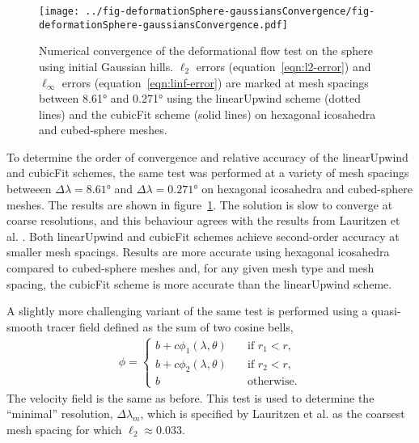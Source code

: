 \begin{figure}
	\centering
	\texttt{[image: ../fig-deformationSphere-gaussiansConvergence/fig-deformationSphere-gaussiansConvergence.pdf]}
%
	\caption{Numerical convergence of the deformational flow test on the sphere using initial Gaussian hills.  $\ell_2$ errors (equation~\ref{eqn:l2-error}) and $\ell_\infty$ errors (equation~\ref{eqn:linf-error}) are marked at mesh spacings between \ang{8.61} and \ang{0.271} using the linearUpwind scheme (dotted lines) and the cubicFit scheme (solid lines) on hexagonal icosahedra and cubed-sphere meshes.}
	\label{fig:deformationSphere-gaussian-convergence}
\end{figure}

To determine the order of convergence and relative accuracy of the linearUpwind and cubicFit schemes, the same test was performed at a variety of mesh spacings betweeen $\Delta \lambda = \ang{8.61}$ and $\Delta \lambda = \ang{0.271}$ on hexagonal icosahedra and cubed-sphere meshes.  The results are shown in figure~\ref{fig:deformationSphere-gaussian-convergence}.
The solution is slow to converge at coarse resolutions, and this behaviour agrees with the results from Lauritzen et al. \citep{lauritzen2012}.  Both linearUpwind and cubicFit schemes achieve second-order accuracy at smaller mesh spacings. 
Results are more accurate using hexagonal icosahedra compared to cubed-sphere meshes and, for any given mesh type and mesh spacing, the cubicFit scheme is more accurate than the linearUpwind scheme.

A slightly more challenging variant of the same test is performed using a quasi-smooth tracer field defined as the sum of two cosine bells,
\begin{align}
	\phi =
	\begin{cases}
		b + c \phi_1(\lambda, \theta) & \quad \text{if $r_1 < r$,} \\
		b + c \phi_2(\lambda, \theta) & \quad \text{if $r_2 < r$,} \\
		b			      & \quad \text{otherwise.}
	\end{cases}
\end{align}
The velocity field is the same as before.  This test is used to determine the ``minimal'' resolution, $\Delta \lambda_m$, which is specified by Lauritzen et al. \citep{lauritzen2012} as the coarsest mesh spacing for which $\ell_2 \approx 0.033$.

